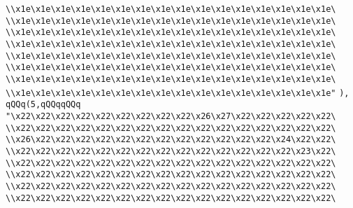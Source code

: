 \verb|\\x1e\x1e\x1e\x1e\x1e\x1e\x1e\x1e\x1e\x1e\x1e\x1e\x1e\x1e\x1e\x1e\|\newline
\verb|\\x1e\x1e\x1e\x1e\x1e\x1e\x1e\x1e\x1e\x1e\x1e\x1e\x1e\x1e\x1e\x1e\|\newline
\verb|\\x1e\x1e\x1e\x1e\x1e\x1e\x1e\x1e\x1e\x1e\x1e\x1e\x1e\x1e\x1e\x1e\|\newline
\verb|\\x1e\x1e\x1e\x1e\x1e\x1e\x1e\x1e\x1e\x1e\x1e\x1e\x1e\x1e\x1e\x1e\|\newline
\verb|\\x1e\x1e\x1e\x1e\x1e\x1e\x1e\x1e\x1e\x1e\x1e\x1e\x1e\x1e\x1e\x1e\|\newline
\verb|\\x1e\x1e\x1e\x1e\x1e\x1e\x1e\x1e\x1e\x1e\x1e\x1e\x1e\x1e\x1e\x1e\|\newline
\verb|\\x1e\x1e\x1e\x1e\x1e\x1e\x1e\x1e\x1e\x1e\x1e\x1e\x1e\x1e\x1e\x1e\|\newline
\verb|\\x1e\x1e\x1e\x1e\x1e\x1e\x1e\x1e\x1e\x1e\x1e\x1e\x1e\x1e\x1e\x1e"|\newline
\verb|),|\newline
\verb|qQQq(5,qQQqqQQq|\newline
\verb|"\x22\x22\x22\x22\x22\x22\x22\x22\x22\x26\x27\x22\x22\x22\x22\x22\|\newline
\verb|\\x22\x22\x22\x22\x22\x22\x22\x22\x22\x22\x22\x22\x22\x22\x22\x22\|\newline
\verb|\\x26\x22\x22\x22\x22\x22\x22\x22\x22\x22\x22\x22\x22\x24\x22\x22\|\newline
\verb|\\x22\x22\x22\x22\x22\x22\x22\x22\x22\x22\x22\x22\x22\x22\x23\x22\|\newline
\verb|\\x22\x22\x22\x22\x22\x22\x22\x22\x22\x22\x22\x22\x22\x22\x22\x22\|\newline
\verb|\\x22\x22\x22\x22\x22\x22\x22\x22\x22\x22\x22\x22\x22\x22\x22\x22\|\newline
\verb|\\x22\x22\x22\x22\x22\x22\x22\x22\x22\x22\x22\x22\x22\x22\x22\x22\|\newline
\verb|\\x22\x22\x22\x22\x22\x22\x22\x22\x22\x22\x22\x22\x22\x22\x22\x22\|\newline
